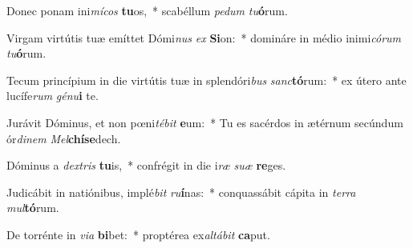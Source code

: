 \item Donec ponam ini\textit{mí}\textit{cos} \textbf{tu}os,~* scabéllum \textit{pe}\textit{dum} \textit{tu}\textbf{ó}rum.
\item Virgam virtútis tuæ emíttet Dómi\textit{nus} \textit{ex} \textbf{Si}on:~* domináre in médio inimi\textit{có}\textit{rum} \textit{tu}\textbf{ó}rum.
\item Tecum princípium in die virtútis tuæ in splendóri\textit{bus} \textit{sanc}\textbf{tó}rum:~* ex útero ante lucífe\textit{rum} \textit{gé}\textit{nu}\textbf{i} te.
\item Jurávit Dóminus, et non pœni\textit{té}\textit{bit} \textbf{e}um:~* Tu es sacérdos in ætérnum secúndum ór\textit{di}\textit{nem} \textit{Mel}\textbf{chí}\textbf{se}dech.
\item Dóminus a \textit{dex}\textit{tris} \textbf{tu}is,~* confrégit in die i\textit{ræ} \textit{su}\textit{æ} \textbf{re}ges.
\item Judicábit in natiónibus, implé\textit{bit} \textit{ru}\textbf{í}nas:~* conquassábit cápita in \textit{ter}\textit{ra} \textit{mul}\textbf{tó}rum.
\item De torrénte in \textit{vi}\textit{a} \textbf{bi}bet:~* proptérea ex\textit{al}\textit{tá}\textit{bit} \textbf{ca}put.
